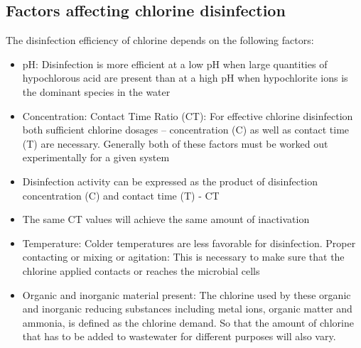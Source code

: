 \subsection{Factors affecting chlorine disinfection}
The disinfection efficiency of chlorine depends on the following factors:\\
\begin{itemize}
	\item pH:  Disinfection is more efficient at a low pH when large quantities of hypochlorous acid are present than at a high pH when hypochlorite ions is the dominant species in the water
	\item Concentration:  Contact Time Ratio (CT):  For effective chlorine disinfection both sufficient chlorine dosages – concentration (C) as well as contact time (T) are necessary.   Generally both of these factors must be worked out experimentally for a given system
	\item Disinfection activity can be expressed as the product of disinfection concentration (C) and contact time (T) - CT
	\item The same CT values will achieve the same amount of inactivation
	\item Temperature:  Colder temperatures are less favorable for disinfection. 
Proper contacting or mixing or agitation:  This is necessary to make sure that the chlorine applied contacts or reaches the microbial cells
	\item Organic and inorganic material present:  The chlorine used by these organic and inorganic reducing substances including metal ions, organic matter and ammonia, is defined as the chlorine demand.  So that the amount of chlorine that has to be added to wastewater for different purposes will also vary.
\end{itemize}

